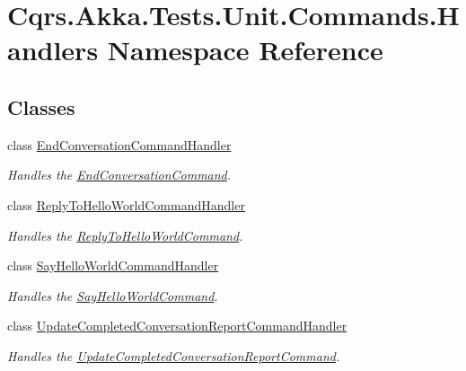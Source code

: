 \hypertarget{namespaceCqrs_1_1Akka_1_1Tests_1_1Unit_1_1Commands_1_1Handlers}{}\section{Cqrs.\+Akka.\+Tests.\+Unit.\+Commands.\+Handlers Namespace Reference}
\label{namespaceCqrs_1_1Akka_1_1Tests_1_1Unit_1_1Commands_1_1Handlers}
\subsection*{Classes}
\begin{DoxyCompactItemize}
\item 
class \hyperlink{classCqrs_1_1Akka_1_1Tests_1_1Unit_1_1Commands_1_1Handlers_1_1EndConversationCommandHandler}{End\+Conversation\+Command\+Handler}
\begin{DoxyCompactList}\small\item\em Handles the \hyperlink{classCqrs_1_1Akka_1_1Tests_1_1Unit_1_1Commands_1_1EndConversationCommand}{End\+Conversation\+Command}. \end{DoxyCompactList}\item 
class \hyperlink{classCqrs_1_1Akka_1_1Tests_1_1Unit_1_1Commands_1_1Handlers_1_1ReplyToHelloWorldCommandHandler}{Reply\+To\+Hello\+World\+Command\+Handler}
\begin{DoxyCompactList}\small\item\em Handles the \hyperlink{classCqrs_1_1Akka_1_1Tests_1_1Unit_1_1Commands_1_1ReplyToHelloWorldCommand}{Reply\+To\+Hello\+World\+Command}. \end{DoxyCompactList}\item 
class \hyperlink{classCqrs_1_1Akka_1_1Tests_1_1Unit_1_1Commands_1_1Handlers_1_1SayHelloWorldCommandHandler}{Say\+Hello\+World\+Command\+Handler}
\begin{DoxyCompactList}\small\item\em Handles the \hyperlink{classCqrs_1_1Akka_1_1Tests_1_1Unit_1_1Commands_1_1SayHelloWorldCommand}{Say\+Hello\+World\+Command}. \end{DoxyCompactList}\item 
class \hyperlink{classCqrs_1_1Akka_1_1Tests_1_1Unit_1_1Commands_1_1Handlers_1_1UpdateCompletedConversationReportCommandHandler}{Update\+Completed\+Conversation\+Report\+Command\+Handler}
\begin{DoxyCompactList}\small\item\em Handles the \hyperlink{classCqrs_1_1Akka_1_1Tests_1_1Unit_1_1Commands_1_1UpdateCompletedConversationReportCommand}{Update\+Completed\+Conversation\+Report\+Command}. \end{DoxyCompactList}\end{DoxyCompactItemize}
